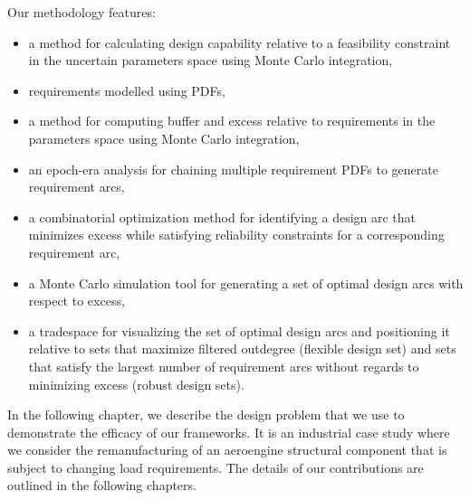 Our methodology features:
\begin{itemize}
	\item a method for calculating design capability relative to a feasibility constraint in the uncertain parameters space using Monte Carlo integration,
	\item requirements modelled using \aclp{PDF},
	\item a method for computing buffer and excess relative to requirements in the parameters space using Monte Carlo integration,
	\item an epoch-era analysis for chaining multiple requirement \aclp{PDF} to generate requirement arcs,
	\item a combinatorial optimization method for identifying a design arc that minimizes excess while satisfying reliability constraints for a corresponding requirement arc,
	\item a Monte Carlo simulation tool for generating a set of optimal design arcs with respect to excess,
	\item a tradespace for visualizing the set of optimal design arcs and positioning it relative to sets that maximize filtered outdegree (flexible design set) and sets that satisfy the largest number of requirement arcs without regards to minimizing excess (robust design sets).
\end{itemize}

In the following chapter, we describe the design problem that we use to demonstrate the efficacy of our frameworks. It is an industrial case study where we consider the remanufacturing of an aeroengine structural component that is subject to changing load requirements. The details of our contributions are outlined in the following chapters.